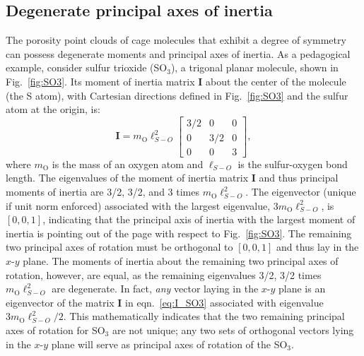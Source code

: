 \documentclass[journal=jacsat,manuscript=article]{achemso}
\begin{document}
{\subsection{Degenerate principal axes of inertia}
\label{sec:degenerate}
The porosity point clouds of cage molecules that exhibit a degree of symmetry can possess degenerate moments and principal axes of inertia. As a pedagogical example, consider sulfur trioxide (SO$_3$), a trigonal planar molecule, shown in Fig.~\ref{fig:SO3}. Its moment of inertia matrix $\mathbf{I}$ about the center of the molecule (the S atom), with Cartesian directions defined in Fig.~\ref{fig:SO3} and the sulfur atom at the origin, is:
\begin{equation}
\mathbf{I} = m_{\text{O}} \ell_{S-O}^2
  \begin{bmatrix}
    3/2 & 0 & 0 \\
    0 & 3/2 & 0 \\
    0 & 0 & 3
  \end{bmatrix}, \label{eq:I_SO3}
\end{equation} where $m_{\text{O}}$ is the mass of an oxygen atom and $\ell_{S-O}$ is the sulfur-oxygen bond length. The eigenvalues of the moment of inertia matrix $\mathbf{I}$ and thus principal moments of inertia are 3/2, 3/2, and 3 times $m_{\text{O}} \ell_{S-O}^2$. The eigenvector (unique if unit norm enforced) associated with the largest eigenvalue, $3 m_{\text{O}} \ell_{S-O}^2$, is $[0, 0, 1]$, indicating that the principal axis of inertia with the largest moment of inertia is pointing out of the page with respect to Fig.~\ref{fig:SO3}. The remaining two principal axes of rotation must be orthogonal to $[0, 0, 1]$ and thus lay in the $x$-$y$ plane. The moments of inertia about the remaining two principal axes of rotation, however, are equal, as the remaining eigenvalues 3/2, 3/2 times $m_{\text{O}} \ell_{S-O}^2$ are degenerate. In fact, \emph{any} vector laying in the $x$-$y$ plane is an eigenvector of the matrix $\mathbf{I}$ in eqn.~\ref{eq:I_SO3} associated with eigenvalue $3m_{\text{O}} \ell_{S-O}^2/2$. This mathematically indicates that the two remaining principal axes of rotation for SO$_3$ are not unique; any two sets of orthogonal vectors lying in the $x$-$y$ plane will serve as principal axes of rotation of the SO$_3$.

}
\end{document}
